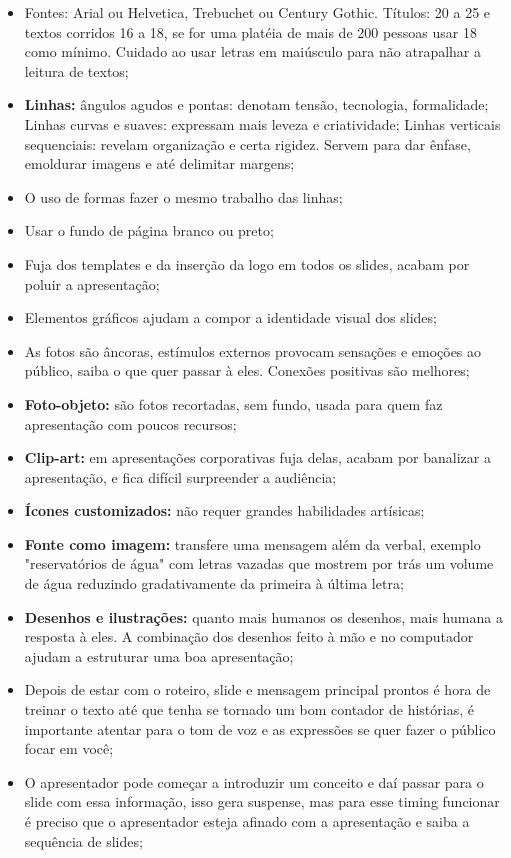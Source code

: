 \begin{itemize}
    \item Fontes: Arial ou Helvetica, Trebuchet ou Century Gothic. Títulos: 20 a 25 e textos corridos 16 a 18, se for uma platéia de mais de 200 pessoas usar 18 como mínimo. Cuidado ao usar letras em maiúsculo para não atrapalhar a leitura de textos;
    \item \textbf{Linhas:} ângulos agudos e pontas: denotam tensão, tecnologia, formalidade; Linhas curvas e suaves: expressam mais leveza e criatividade; Linhas verticais sequenciais: revelam organização e certa rigidez. Servem para dar ênfase, emoldurar imagens e até delimitar margens;
    \item O uso de formas fazer o mesmo trabalho das linhas;
    \item Usar o fundo de página branco ou preto;
    \item Fuja dos templates e da inserção da logo em todos os slides, acabam por poluir a apresentação;
    \item Elementos gráficos ajudam a compor a identidade visual dos slides;
    \item As fotos são âncoras, estímulos externos provocam sensações e emoções ao público, saiba o que quer passar à eles. Conexões positivas são melhores;
    \item \textbf{Foto-objeto:} são fotos recortadas, sem fundo, usada para quem faz apresentação com poucos recursos;
    \item \textbf{Clip-art:} em apresentações corporativas fuja delas, acabam por banalizar a apresentação, e fica difícil surpreender a audiência;
    \item \textbf{Ícones customizados:} não requer grandes habilidades artísicas; 
    \item \textbf{Fonte como imagem:} transfere uma mensagem além da verbal, exemplo "reservatórios de água"  com letras vazadas que mostrem por trás um volume de água reduzindo gradativamente da primeira à última letra;
    \item \textbf{Desenhos e ilustrações:} quanto mais humanos os desenhos, mais humana a resposta à eles. A combinação dos desenhos feito à mão e no computador ajudam a estruturar uma boa apresentação;
    \item Depois de estar com o roteiro, slide e mensagem principal prontos é hora de treinar o texto até que tenha se tornado um bom contador de histórias, é importante atentar para o tom de voz e as expressões se quer fazer o público focar em você;
    \item O apresentador pode começar a introduzir um conceito e daí passar para o slide com essa informação, isso gera suspense, mas para esse timing funcionar é preciso que o apresentador esteja afinado com a apresentação e saiba a sequência de slides;

\end{itemize}
